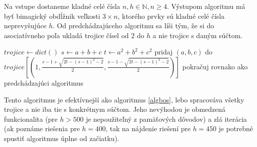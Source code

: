 \begin{alg}
\label{algboh}
Na vstupe dostaneme kladné celé čísla $n,h \in \mathbb{N}, n \geq 4$. Výstupom algoritmu má byť bimagický obdĺžnik veľkosti $3 \times n$, ktorého prvky sú kladné celé čísla neprevyšujúce $h$. Od predchádzajúceho algoritmu sa líši tým, že si do asociatívneho poľa ukladá trojice čísel od $2$ do $h$ a nie trojice s daným súčtom.
\end{alg}

\begin{algorithmic}
\STATE $trojice \gets dict()$
			\STATE $s \gets a+b+c$
			\STATE $t \gets a^2+b^2+c^2$
				\STATE pridaj $(a,b,c)$ do $trojice[(1, \frac{s-1 + \sqrt{2t - (s-1)^2 - 2}}{2}, \frac{s-1 - \sqrt{2t - (s-1)^2 - 2}}{2})]$
			\ENDIF
		\ENDFOR
	\ENDFOR
\ENDFOR
\STATE pokračuj rovnako ako predchádzajúci algoritmus
\end{algorithmic}

Tento algoritmus je efektívnejší ako algoritmus \ref{algbos}, lebo spracováva všetky trojice a nie iba tie s konkrétnym súčtom. Jeho nevýhodou je obmedzená funkcionalita (pre $h > 500$ je nepoužiteľný z pamäťových dôvodov) a zlá iterácia (ak poznáme riešenia pre $h = 400$, tak na nájdenie riešení pre $h = 450$ je potrebné spustiť algoritmus úplne od začiatku).




